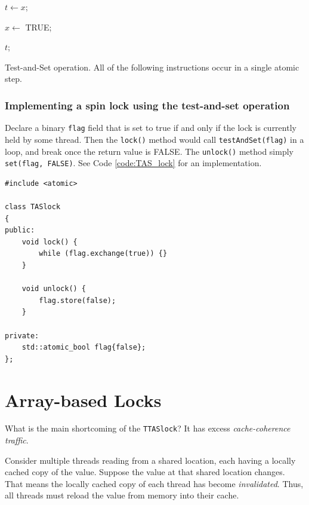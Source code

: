 \begin{algorithm}[H]
    \BlankLine
    $t \leftarrow x$;
    
    $x \leftarrow $ TRUE;
    
    \Return $t$;
    \caption{Test-and-Set operation. All of the following instructions occur in a single atomic step.}
    \label{alg:testAndSet}
\end{algorithm}

\subsubsection{Implementing a spin lock using the test-and-set operation}
Declare a binary \verb|flag| field that is set to true if and only if the lock is currently held by some thread. Then the \verb|lock()| method would call \verb|testAndSet(flag)| in a loop, and break once the return value is FALSE. The \verb|unlock()| method simply \verb|set(flag, FALSE)|. See Code \ref{code:TAS_lock} for an implementation.

\makebox[\linewidth]{\rule{17cm}{0.4pt}}
{\centering \label{code:TAS_lock}
\begin{verbatim}
#include <atomic>

class TASlock
{
public:
    void lock() {
        while (flag.exchange(true)) {}
    }

    void unlock() {
        flag.store(false);
    }

private:
    std::atomic_bool flag{false};
};
\end{verbatim}
\makebox[\linewidth]{\rule{17cm}{0.4pt}}
}

\section{Array-based Locks}
What is the main shortcoming of the \verb|TTASlock|? It has excess \textit{cache-coherence traffic}.

\begin{definition}
    Consider multiple threads reading from a shared location, each having a locally cached copy of the value. Suppose the value at that shared location changes. That means the locally cached copy of each thread has become \textit{invalidated}. Thus, all threads must reload the value from memory into their cache.
\end{definition}

